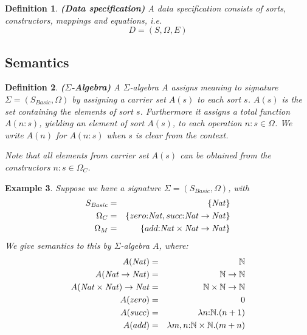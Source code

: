 \documentclass[a4paper,11pt]{article}
\newcommand{\Nats}{{\mathbb N}}    %
\newcommand{\basicsort}{{S_{\mathit{Basic}}}}
\newtheorem{thdefinition}{Definition}[section]
\newenvironment{definition}
  {\begin{thdefinition}\em}
  {\end{thdefinition}}
\newtheorem{thexample}[thdefinition]{Example}
\newenvironment{example}
  {\begin{thexample}\em}
  {\end{thexample}}
\begin{document}
\begin{definition}\textbf{(Data specification)}
A data specification consists of sorts, constructors, mappings and equations, i.e.
\begin{equation*}
 D = (S, \Omega, E)
\end{equation*}
\end{definition}

\subsection{Semantics}
\begin{definition}\textbf{($\Sigma$-Algebra)}
A $\Sigma$-algebra $A$ assigns meaning to signature $\Sigma = (\basicsort, \Omega)$ by assigning a carrier set $A(s)$ to each sort $s$. $A(s)$ is the set containing the elements of sort $s$. Furthermore it assigns a total function $A(n {:} s)$, yielding an element of sort $A(s)$, to each operation $n {:} s \in \Omega$. We write $A(n)$ for $A(n {:} s)$ when $s$ is clear from the context.

Note that all elements from carrier set $A(s)$ can be obtained from the constructors $n {:} s \in \Omega_C$.
\end{definition}

\begin{example}
Suppose we have a signature $\Sigma = (\basicsort, \Omega)$, with
\begin{eqnarray*}
\basicsort & = & \{ {\it Nat} \}\\
\Omega_C & = & \{ zero{:}{\it Nat}, succ{:}{\it Nat} \rightarrow {\it Nat} \}\\
\Omega_M & = & \{ add {:} {\it Nat} \times {\it Nat} \rightarrow {\it Nat} \}
\end{eqnarray*}
We give semantics to this by $\Sigma$-algebra $A$, where:
\begin{eqnarray*}
 A({\it Nat})                                             & = & \Nats \\
 A({\it Nat} \rightarrow {\it Nat})                       & = & \Nats \rightarrow \Nats \\
 A({\it Nat} \times {\it Nat}) \rightarrow {\it {\it Nat}} & = & \Nats \times \Nats \rightarrow \Nats \\
 A(zero)                          & = & 0 \\
 A(succ)                          & = & \lambda n {:} \Nats . (n + 1) \\
 A(add)                           & = & \lambda m, n {:} \Nats \times \Nats . (m + n)
\end{eqnarray*}
\end{example}
\end{document}
